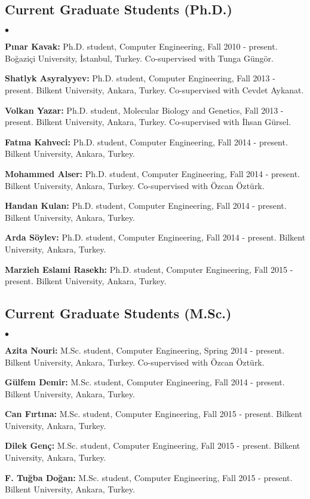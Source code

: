 \documentclass[margin,line]{res}
\newenvironment{list2}{
  \begin{list}{$\bullet$}{%
      \setlength{\itemsep}{0in}
      \setlength{\parsep}{0in} \setlength{\parskip}{0in}
      \setlength{\topsep}{0in} \setlength{\partopsep}{0in} 
      \setlength{\leftmargin}{0.2in}}}{\end{list}}
\begin{document}
\begin{resume}
\subsection{\small \sc Current Graduate Students (Ph.D.)}
\begin{list2}
\item
  {\bf P{\i}nar Kavak:} Ph.D. student, Computer Engineering, Fall 2010 - present.
  Bo\u{g}azi\c{c}i University, \.{I}stanbul, Turkey. Co-supervised with Tunga G\"{u}ng\"{o}r.
\item
  {\bf Shatlyk Asyralyyev:} Ph.D. student, Computer Engineering, Fall 2013 - present.
  Bilkent University, Ankara, Turkey. Co-supervised with Cevdet Aykanat.
\item
  {\bf Volkan Yazar:} Ph.D. student, Molecular Biology and Genetics, Fall 2013 - present.
  Bilkent University, Ankara, Turkey. Co-supervised with İhsan Gürsel.
\item
  {\bf Fatma Kahveci:} Ph.D. student, Computer Engineering, Fall 2014 - present.
  Bilkent University, Ankara, Turkey.
\item
  {\bf Mohammed Alser:} Ph.D. student, Computer Engineering, Fall 2014 - present.
  Bilkent University, Ankara, Turkey. Co-supervised with Özcan Öztürk.
\item
  {\bf Handan Kulan:} Ph.D. student, Computer Engineering, Fall 2014 - present.
  Bilkent University, Ankara, Turkey. 
\item
  {\bf Arda Söylev:} Ph.D. student, Computer Engineering, Fall 2014 - present.
  Bilkent University, Ankara, Turkey. 
\item
  {\bf Marzieh Eslami Rasekh:} Ph.D. student, Computer Engineering, Fall 2015 - present.
  Bilkent University, Ankara, Turkey. 
\end{list2}
\subsection{\small \sc Current Graduate Students (M.Sc.)}
\begin{list2}
\item
  {\bf Azita Nouri:} M.Sc. student, Computer Engineering, Spring 2014 - present.
  Bilkent University, Ankara, Turkey. Co-supervised with Özcan Öztürk.
\item
  {\bf Gülfem Demir:} M.Sc. student, Computer Engineering, Fall 2014 - present.
  Bilkent University, Ankara, Turkey. 
\item
  {\bf Can Fırtına:} M.Sc. student, Computer Engineering, Fall 2015 - present.
  Bilkent University, Ankara, Turkey. 
\item
  {\bf Dilek Genç:} M.Sc. student, Computer Engineering, Fall 2015 - present.
  Bilkent University, Ankara, Turkey. 
\item
  {\bf F. Tuğba Doğan:} M.Sc. student, Computer Engineering, Fall 2015 - present.
  Bilkent University, Ankara, Turkey. 
\end{list2}


\end{resume}
\end{document}
